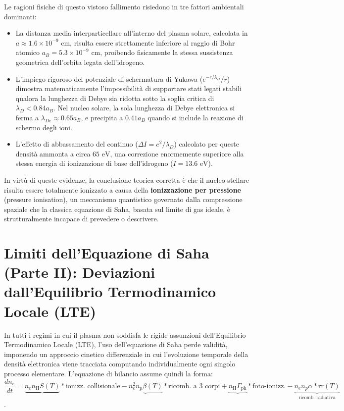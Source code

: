 Le ragioni fisiche di questo vistoso fallimento risiedono in tre fattori ambientali dominanti:
\begin{itemize}
\item La distanza media interparticellare all'interno del plasma solare, calcolata in $a \approx 1.6 \times 10^{-9} \text{ cm}$, risulta essere strettamente inferiore al raggio di Bohr atomico $a_B = 5.3 \times 10^{-9} \text{ cm}$, proibendo fisicamente la stessa sussistenza geometrica dell'orbita legata dell'idrogeno.
\item L'impiego rigoroso del potenziale di schermatura di Yukawa ($e^{-r/\lambda_D}/r$) dimostra matematicamente l'impossibilità di supportare stati legati stabili qualora la lunghezza di Debye sia ridotta sotto la soglia critica di $\lambda_D < 0.84 a_B$. Nel nucleo solare, la sola lunghezza di Debye elettronica si ferma a $\lambda_{De} \approx 0.65 a_B$, e precipita a $0.41 a_B$ quando si include la reazione di schermo degli ioni.
\item L'effetto di abbassamento del continuo ($\Delta I = e^2/\lambda_D$) calcolato per queste densità ammonta a circa $65 \text{ eV}$, una correzione enormemente superiore alla stessa energia di ionizzazione di base dell'idrogeno ($I = 13.6 \text{ eV}$).
\end{itemize}
In virtù di queste evidenze, la conclusione teorica corretta è che il nucleo stellare risulta essere totalmente ionizzato a causa della \textbf{ionizzazione per pressione} (pressure ionisation), un meccanismo quantistico governato dalla compressione spaziale che la classica equazione di Saha, basata sul limite di gas ideale, è strutturalmente incapace di prevedere o descrivere.

\section{Limiti dell'Equazione di Saha (Parte II): Deviazioni dall'Equilibrio Termodinamico Locale (LTE)}

In tutti i regimi in cui il plasma non soddisfa le rigide assunzioni dell'Equilibrio Termodinamico Locale (LTE), l'uso dell'equazione di Saha perde validità, imponendo un approccio cinetico differenziale in cui l'evoluzione temporale della densità elettronica viene tracciata computando individualmente ogni singolo processo elementare. L'equazione di bilancio assume quindi la forma:
\begin{equation}
\frac{dn_e}{dt} = \underbrace{n_e n_{\text{H}} S(T)}*{\text{ionizz. collisionale}} - \underbrace{n_e^2 n_p \beta(T)}*{\text{ricomb. a 3 corpi}} + \underbrace{n_{\text{H}} \Gamma_{\text{ph}}}*{\text{foto-ionizz.}} - \underbrace{n_e n_p \alpha*{\text{rr}}(T)}_{\text{ricomb. radiativa}}
\end{equation}
.

